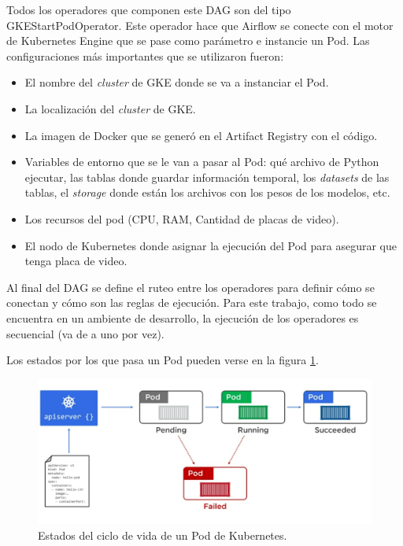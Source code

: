 Todos los operadores que componen este DAG son del tipo GKEStartPodOperator. Este operador hace que Airflow se conecte con el motor de Kubernetes Engine que se pase como parámetro e instancie un Pod. Las configuraciones más importantes que se utilizaron fueron:
\begin{itemize}
	\item El nombre del \textit{cluster} de GKE donde se va a instanciar el Pod.
	\item La localización del \textit{cluster} de GKE.
	\item La imagen de Docker que se generó en el Artifact Registry con el código.
	\item Variables de entorno que se le van a pasar al Pod: qué archivo de Python ejecutar, las tablas donde guardar información temporal, los \textit{datasets} de las tablas, el \textit{storage} donde están los archivos con los pesos de los modelos, etc.
	\item Los recursos del pod (CPU, RAM, Cantidad de placas de video).
	\item El nodo de Kubernetes donde asignar la ejecución del Pod para asegurar que tenga placa de video.
\end{itemize}

Al final del DAG se define el ruteo entre los operadores para definir cómo se conectan y cómo son las reglas de ejecución. Para este trabajo, como todo se encuentra en un ambiente de desarrollo, la ejecución de los operadores es secuencial (va de a uno por vez).

Los estados por los que pasa un Pod pueden verse en la figura \ref{fig:cap3-pod-lc}.

\begin{figure}[htbp]
	\centering
	\includegraphics[width=.8\textwidth]{./Figures/pod-lifecycle.jpeg}
	\caption{Estados del ciclo de vida de un Pod de Kubernetes\protect\footnotemark.}
	\label{fig:cap3-pod-lc}
\end{figure}


